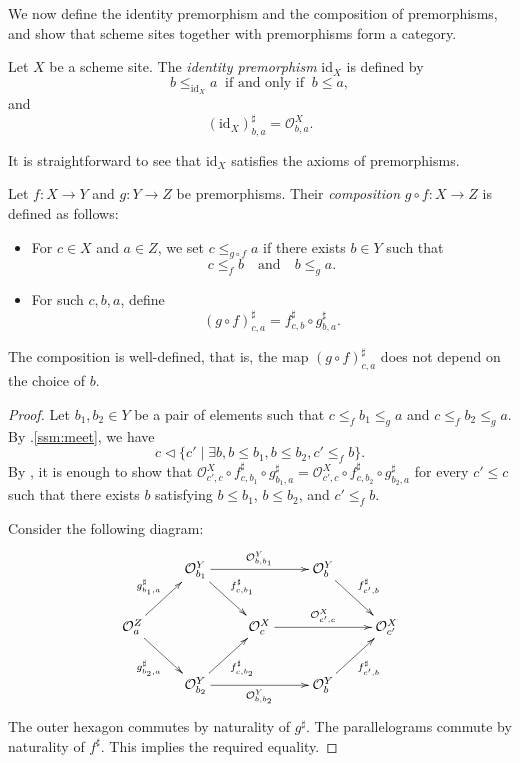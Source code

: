\documentclass[reqno]{amsart}
\theoremstyle{definition}
\theoremstyle{remark}
\numberwithin{figure}{section}
\newcommand{\cover}{\triangleleft}
\begin{document}
We now define the identity premorphism and the composition of premorphisms, and show that scheme sites together with premorphisms form a category.

\begin{defn}
Let $X$ be a scheme site. The \emph{identity premorphism} $\mathrm{id}_X$ is defined by
\[
b \leq_{\mathrm{id}_X} a \;\;\text{if and only if}\;\; b \leq a,
\]
and
\[
(\mathrm{id}_X)^\sharp_{b,a} = \mathcal{O}^X_{b,a}.
\]
\end{defn}

It is straightforward to see that $\mathrm{id}_X$ satisfies the axioms of premorphisms.

\begin{defn}
Let $f : X \to Y$ and $g : Y \to Z$ be premorphisms. Their \emph{composition} $g \circ f : X \to Z$ is defined as follows:
\begin{itemize}
\item For $c \in X$ and $a \in Z$, we set $c \leq_{g \circ f} a$ if there exists $b \in Y$ such that
\[
c \leq_f b \quad \text{and} \quad b \leq_g a.
\]
\item For such $c,b,a$, define
\[
(g \circ f)^\sharp_{c,a} = f^\sharp_{c,b} \circ g^\sharp_{b,a}.
\]
\end{itemize}
\end{defn}

\begin{lem}
The composition is well-defined, that is, the map $(g \circ f)^\sharp_{c,a}$ does not depend on the choice of $b$.
\end{lem}
\begin{proof}
Let $b_1,b_2 \in Y$ be a pair of elements such that $c \leq_f b_1 \leq_g a$ and $c \leq_f b_2 \leq_g a$.
By .\eqref{ssm:meet}, we have
\[ c \cover \{ c' \mid \exists b, b \leq b_1, b \leq b_2, c' \leq_f b \}. \]
By , it is enough to show that $\mathcal{O}^X_{c',c} \circ f^\sharp_{c,b_1} \circ g^\sharp_{b_1,a} = \mathcal{O}^X_{c',c} \circ f^\sharp_{c,b_2} \circ g^\sharp_{b_2,a}$
for every $c' \leq c$ such that there exists $b$ satisfying $b \leq b_1$, $b \leq b_2$, and $c' \leq_f b$.

Consider the following diagram:
\[ \xymatrix{                                                                       & \mathcal{O}^Y_{b_1} \ar[rr]^{\mathcal{O}^Y_{b,b_1}} \ar[dr]^{f^\sharp_{c,b_1}}  & & \mathcal{O}^Y_b \ar[rd]^{f^\sharp_{c',b}} \\
              \mathcal{O}^Z_a \ar[ur]^{g^\sharp_{b_1,a}} \ar[dr]_{g^\sharp_{b_2,a}} &                                                                                 & \mathcal{O}^X_c \ar[rr]^{\mathcal{O}^X_{c',c}} & & \mathcal{O}^X_{c'} \\
                                                                                    & \mathcal{O}^Y_{b_2} \ar[rr]_{\mathcal{O}^Y_{b,b_2}}  \ar[ur]_{f^\sharp_{c,b_2}} & & \mathcal{O}^Y_b \ar[ur]_{f^\sharp_{c',b}}  
            } \]
The outer hexagon commutes by naturality of $g^\sharp$.
The parallelograms commute by naturality of $f^\sharp$.
This implies the required equality.
\end{proof}
\end{document}
